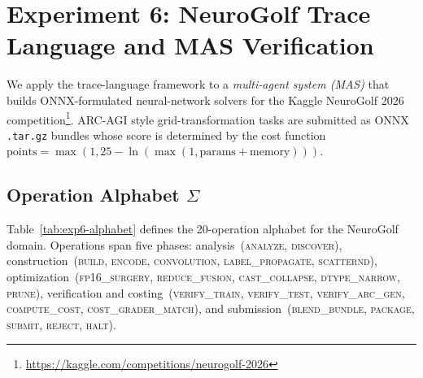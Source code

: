 \section{Experiment 6: NeuroGolf Trace Language and MAS Verification}
\label{sec:experiment-6}

We apply the trace-language framework to a \emph{multi-agent system (MAS)} that
builds ONNX-formulated neural-network solvers for the Kaggle NeuroGolf 2026
competition\footnote{\url{https://kaggle.com/competitions/neurogolf-2026}}.
ARC-AGI style grid-transformation tasks are submitted as ONNX \texttt{.tar.gz}
bundles whose score is determined by the cost function
\(\text{points} = \max(1, 25 - \ln(\max(1, \text{params} + \text{memory})))\).

\subsection{Operation Alphabet \(\Sigma\)}
\label{sec:exp6-alphabet}

Table~\ref{tab:exp6-alphabet} defines the 20-operation alphabet for the
NeuroGolf domain. Operations span five phases: analysis~(\textsc{analyze},
\textsc{discover}), construction~(\textsc{build}, \textsc{encode},
\textsc{convolution}, \textsc{label\_propagate}, \textsc{scatternd}),
optimization~(\textsc{fp16\_surgery}, \textsc{reduce\_fusion},
\textsc{cast\_collapse}, \textsc{dtype\_narrow}, \textsc{prune}),
verification and costing~(\textsc{verify\_train}, \textsc{verify\_test},
\textsc{verify\_arc\_gen}, \textsc{compute\_cost}, \textsc{cost\_grader\_match}),
and submission~(\textsc{blend\_bundle}, \textsc{package},
\textsc{submit}, \textsc{reject}, \textsc{halt}).

